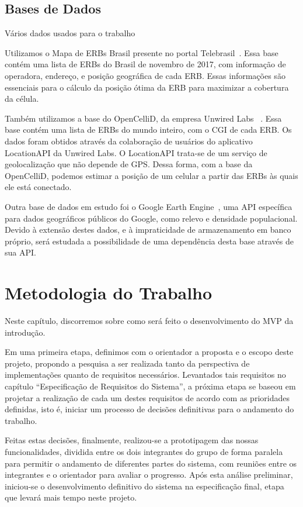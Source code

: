 \documentclass[]{politex}
\begin{document}
\section{Bases de Dados}
Vários dados usados para o trabalho

Utilizamos o Mapa de ERBs Brasil presente no portal Telebrasil~\cite{mapa-erb}.
Essa base contém uma lista de ERBs do Brasil de novembro de 2017, com
informação de operadora, endereço, e posição geográfica de cada ERB.
Essas informações são essenciais para o cálculo da posição ótima da ERB para
maximizar a cobertura da célula.

Também utilizamos a base do OpenCelliD, da empresa Unwired Labs
~\cite{opencellid}. Essa base contém uma lista de ERBs do mundo inteiro, com o
CGI de cada ERB. Os dados foram obtidos através da colaboração de usuários do
aplicativo LocationAPI da Unwired Labs. O LocationAPI trata-se de um serviço de
geolocalização que não depende de GPS. Dessa forma, com a base da OpenCelliD,
podemos estimar a posição de um celular a partir das ERBs às quais ele está
conectado.

Outra base de dados em estudo foi o Google Earth Engine~\cite{earthengine}, uma
API específica para dados geográficos públicos do Google, como relevo e
densidade populacional. Devido à extensão destes dados, e à impraticidade de
armazenamento em banco próprio, será estudada a possibilidade de uma dependência
desta base através de sua API.

\chapter{Metodologia do Trabalho}

Neste capítulo, discorremos sobre como será feito o desenvolvimento do MVP da
introdução.

Em uma primeira etapa, definimos com o orientador a proposta e o escopo deste
projeto, propondo a pesquisa a ser realizada tanto da perspectiva de
implementações quanto de requisitos necessários. Levantados tais requisitos no
capítulo ``Especificação de Requisitos do Sistema'', a próxima etapa se baseou
em projetar a realização de cada um destes requisitos de acordo com as
prioridades definidas, isto é, iniciar um processo de decisões definitivas para
o andamento do trabalho.

Feitas estas decisões, finalmente, realizou-se a prototipagem das nossas
funcionalidades, dividida entre os dois integrantes do grupo de forma paralela
para permitir o andamento de diferentes partes do sistema, com reuniões entre
os integrantes e o orientador para avaliar o progresso. Após esta análise
preliminar, iniciou-se o desenvolvimento definitivo do sistema na especificação
final, etapa que levará mais tempo neste projeto.
\end{document}
